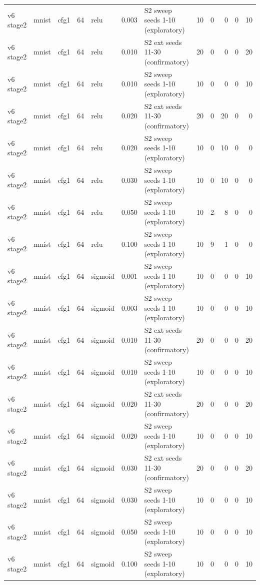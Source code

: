 \begin{table}[htbp]
{\begin{tabular}{@{}lllrlrlrrrrr@{}}
v6 stage2 & mnist & cfg1 & 64 & relu & 0.003 & S2 sweep seeds 1-10 (exploratory) & 10 & 0 & 0 & 0 & 10 \\
v6 stage2 & mnist & cfg1 & 64 & relu & 0.010 & S2 ext seeds 11-30 (confirmatory) & 20 & 0 & 0 & 0 & 20 \\
v6 stage2 & mnist & cfg1 & 64 & relu & 0.010 & S2 sweep seeds 1-10 (exploratory) & 10 & 0 & 0 & 0 & 10 \\
v6 stage2 & mnist & cfg1 & 64 & relu & 0.020 & S2 ext seeds 11-30 (confirmatory) & 20 & 0 & 20 & 0 & 0 \\
v6 stage2 & mnist & cfg1 & 64 & relu & 0.020 & S2 sweep seeds 1-10 (exploratory) & 10 & 0 & 10 & 0 & 0 \\
v6 stage2 & mnist & cfg1 & 64 & relu & 0.030 & S2 sweep seeds 1-10 (exploratory) & 10 & 0 & 10 & 0 & 0 \\
v6 stage2 & mnist & cfg1 & 64 & relu & 0.050 & S2 sweep seeds 1-10 (exploratory) & 10 & 2 & 8 & 0 & 0 \\
v6 stage2 & mnist & cfg1 & 64 & relu & 0.100 & S2 sweep seeds 1-10 (exploratory) & 10 & 9 & 1 & 0 & 0 \\
v6 stage2 & mnist & cfg1 & 64 & sigmoid & 0.001 & S2 sweep seeds 1-10 (exploratory) & 10 & 0 & 0 & 0 & 10 \\
v6 stage2 & mnist & cfg1 & 64 & sigmoid & 0.003 & S2 sweep seeds 1-10 (exploratory) & 10 & 0 & 0 & 0 & 10 \\
v6 stage2 & mnist & cfg1 & 64 & sigmoid & 0.010 & S2 ext seeds 11-30 (confirmatory) & 20 & 0 & 0 & 0 & 20 \\
v6 stage2 & mnist & cfg1 & 64 & sigmoid & 0.010 & S2 sweep seeds 1-10 (exploratory) & 10 & 0 & 0 & 0 & 10 \\
v6 stage2 & mnist & cfg1 & 64 & sigmoid & 0.020 & S2 ext seeds 11-30 (confirmatory) & 20 & 0 & 0 & 0 & 20 \\
v6 stage2 & mnist & cfg1 & 64 & sigmoid & 0.020 & S2 sweep seeds 1-10 (exploratory) & 10 & 0 & 0 & 0 & 10 \\
v6 stage2 & mnist & cfg1 & 64 & sigmoid & 0.030 & S2 ext seeds 11-30 (confirmatory) & 20 & 0 & 0 & 0 & 20 \\
v6 stage2 & mnist & cfg1 & 64 & sigmoid & 0.030 & S2 sweep seeds 1-10 (exploratory) & 10 & 0 & 0 & 0 & 10 \\
v6 stage2 & mnist & cfg1 & 64 & sigmoid & 0.050 & S2 sweep seeds 1-10 (exploratory) & 10 & 0 & 0 & 0 & 10 \\
v6 stage2 & mnist & cfg1 & 64 & sigmoid & 0.100 & S2 sweep seeds 1-10 (exploratory) & 10 & 0 & 0 & 0 & 10 \\

\end{tabular}}
\end{table}
